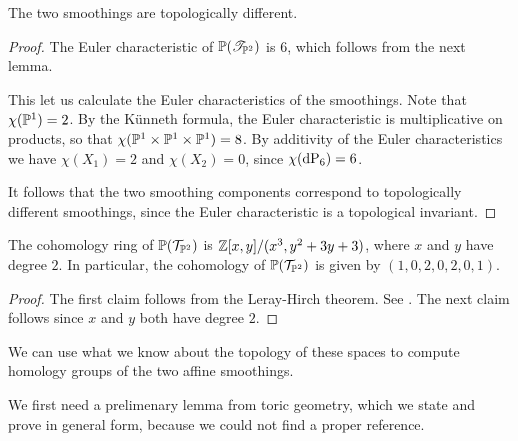 \begin{proposition}
The two smoothings are topologically different.
\end{proposition}
\begin{proof}
The Euler characteristic of $\P(\mathscr T_{\P^2})$ is $6$, which follows from the next lemma.

This let us calculate the Euler characteristics of the smoothings. Note that $\chi(\P^1)=2$. By the Künneth formula, the Euler characteristic is multiplicative on products, so that $\chi(\P^1 \times \P^1 \times \P^1)=8$. By additivity of the Euler characteristics we have $\chi(X_1)=2$ and $\chi(X_2)=0$, since $\chi(\dP6)=6$.

It follows that the two smoothing components correspond to topologically different smoothings, since the Euler characteristic is a topological invariant.
\end{proof}

\begin{lemma}
The cohomology ring of $\P(\mathcal T_{\P^2})$ is $\Z[x,y]/(x^3,y^2+3y+3)$, where $x$ and $y$ have degree $2$. In particular, the cohomology of $\P(\mathcal T_{\P^2})$ is given by $(1,0,2,0,2,0,1)$.
\end{lemma}
\begin{proof}
The first claim follows from the Leray-Hirch theorem. See \cite[page 270]{bott_tu}. The next claim follows since $x$ and $y$ both have degree $2$.
\end{proof}

We can use what we know about the topology of these spaces to compute homology groups of the two affine smoothings.

We first need a prelimenary lemma from toric geometry, which we state and prove in general form, because we could not find a proper reference.

